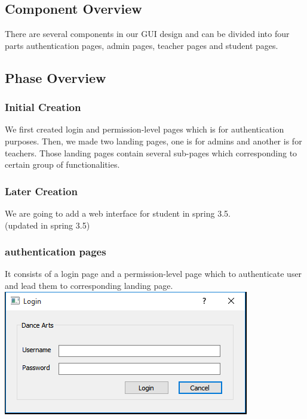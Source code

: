 \subsection{Component  Overview}
There are several components in our GUI design and can be divided into four parts authentication pages, admin pages, teacher pages and student pages.

\subsection{Phase Overview}
\subsubsection{Initial Creation}
We first created login and permission-level pages which is for authentication purposes. Then, we made two landing pages, one is for admins and another is for teachers. Those landing pages contain several sub-pages which corresponding to certain group of functionalities.
\subsubsection{Later Creation}
We are going to add a web interface for student in spring 3.5.\\
(updated in spring 3.5)\\
 
\subsubsection{authentication pages}
It consists of a login page and a permission-level page which to authenticate user and lead them to corresponding landing page.\\
\includegraphics[scale=0.7]{pics/login_page.png}
